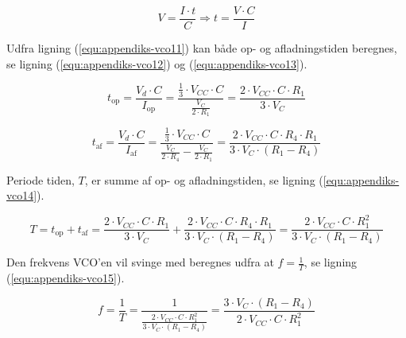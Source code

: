 \begin{equation}
\label{equ:appendiks-vco11}
V = \frac{I \cdot t}{C} \Rightarrow t = \frac{V \cdot C}{I}
\end{equation}

Udfra ligning (\ref{equ:appendiks-vco11}) kan både op- og afladningstiden beregnes, se ligning (\ref{equ:appendiks-vco12}) og (\ref{equ:appendiks-vco13}).

\begin{equation}
\label{equ:appendiks-vco12}
t_{\mathrm{op}} = \frac{V_d \cdot C}{I_{\mathrm{op}}} = \frac{\frac{1}{3} \cdot V_{CC} \cdot C}{\frac{V_C}{2 \cdot R_1}} = \frac{2 \cdot V_{CC} \cdot C \cdot R_1}{3 \cdot V_C}
\end{equation}

\begin{equation}
\label{equ:appendiks-vco13}
t_{\mathrm{af}} = \frac{V_d \cdot C}{I_{\mathrm{af}}} = \frac{\frac{1}{3} \cdot V_{CC} \cdot C}{\frac{V_C}{2 \cdot R_4} - \frac{V_C}{2 \cdot R_1}} = \frac{2 \cdot V_{CC} \cdot C \cdot R_4 \cdot R_1}{3 \cdot V_C \cdot (R_1 - R_4)}
\end{equation}

Periode tiden, $T$, er summe af op- og afladningstiden, se ligning (\ref{equ:appendiks-vco14}).

\begin{equation}
\label{equ:appendiks-vco14}
T = t_{\mathrm{op}} + t_{\mathrm{af}} = \frac{2 \cdot V_{CC} \cdot C \cdot R_1}{3 \cdot V_C} + \frac{2 \cdot V_{CC} \cdot C \cdot R_4 \cdot R_1}{3 \cdot V_C \cdot (R_1 - R_4)} = \frac{2 \cdot V_{CC} \cdot C \cdot R_1^2}{3 \cdot V_C \cdot (R_1 - R_4)}
\end{equation}

Den frekvens VCO'en vil svinge med beregnes udfra at $f = \frac{1}{T}$, se ligning (\ref{equ:appendiks-vco15}).

\begin{equation}
\label{equ:appendiks-vco15}
f = \frac{1}{T} = \frac{1}{\frac{2 \cdot V_{CC} \cdot C \cdot R_1^2}{3 \cdot V_C \cdot (R_1 - R_4)}} = \frac{3 \cdot V_C \cdot (R_1 - R_4)}{2 \cdot V_{CC} \cdot C \cdot R_1^2}
\end{equation}